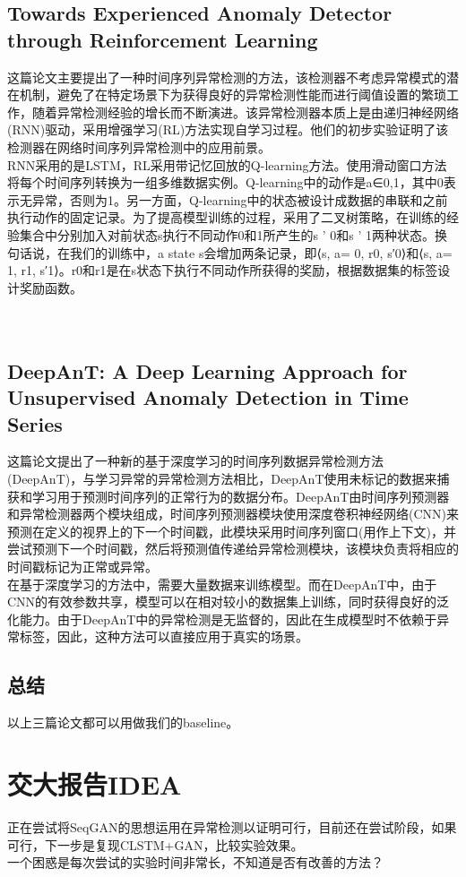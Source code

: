 \documentclass[11pt,a4paper]{ctexart}
\begin{document}
\subsection{Towards Experienced Anomaly Detector through Reinforcement Learning}
\noindent 这篇论文主要提出了一种时间序列异常检测的方法，该检测器不考虑异常模式的潜在机制，避免了在特定场景下为获得良好的异常检测性能而进行阈值设置的繁琐工作，随着异常检测经验的增长而不断演进。该异常检测器本质上是由递归神经网络(RNN)驱动，采用增强学习(RL)方法实现自学习过程。他们的初步实验证明了该检测器在网络时间序列异常检测中的应用前景。\\
RNN采用的是LSTM，RL采用带记忆回放的Q-learning方法。使用滑动窗口方法将每个时间序列转换为一组多维数据实例。Q-learning中的动作是a∈{0,1}，其中0表示无异常，否则为1。另一方面，Q-learning中的状态被设计成数据的串联和之前执行动作的固定记录。为了提高模型训练的过程，采用了二叉树策略，在训练的经验集合中分别加入对前状态s执行不同动作0和1所产生的s ' 0和s ' 1两种状态。换句话说，在我们的训练中，a state s会增加两条记录，即⟨s, a= 0, r0, s′0⟩和⟨s, a= 1, r1, s′1⟩。r0和r1是在s状态下执行不同动作所获得的奖励，根据数据集的标签设计奖励函数。\\\\\\\subsection{DeepAnT: A Deep Learning Approach for Unsupervised Anomaly Detection in Time Series}
\noindent 这篇论文提出了一种新的基于深度学习的时间序列数据异常检测方法(DeepAnT)，与学习异常的异常检测方法相比，DeepAnT使用未标记的数据来捕获和学习用于预测时间序列的正常行为的数据分布。DeepAnT由时间序列预测器和异常检测器两个模块组成，时间序列预测器模块使用深度卷积神经网络(CNN)来预测在定义的视界上的下一个时间戳，此模块采用时间序列窗口(用作上下文)，并尝试预测下一个时间戳，然后将预测值传递给异常检测模块，该模块负责将相应的时间戳标记为正常或异常。\\
在基于深度学习的方法中，需要大量数据来训练模型。而在DeepAnT中，由于CNN的有效参数共享，模型可以在相对较小的数据集上训练，同时获得良好的泛化能力。由于DeepAnT中的异常检测是无监督的，因此在生成模型时不依赖于异常标签，因此，这种方法可以直接应用于真实的场景。
\subsection{总结}
\noindent 以上三篇论文都可以用做我们的baseline。
\section{交大报告IDEA}
\noindent 正在尝试将SeqGAN的思想运用在异常检测以证明可行，目前还在尝试阶段，如果可行，下一步是复现CLSTM+GAN，比较实验效果。\\
一个困惑是每次尝试的实验时间非常长，不知道是否有改善的方法？
	
\end{document}
